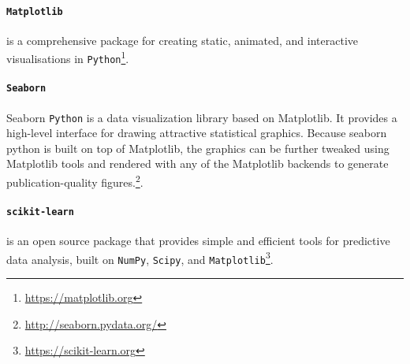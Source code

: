 \paragraph*{\texttt{Matplotlib}} is a comprehensive package for creating static, animated, and interactive visualisations in \texttt{Python}\footnote{\url{https://matplotlib.org}}.

\paragraph*{\texttt{Seaborn}} Seaborn \texttt{Python} is a data visualization library based on Matplotlib. It provides a high-level interface for drawing attractive statistical graphics. Because seaborn python is built on top of Matplotlib, the graphics can be further tweaked using Matplotlib tools and rendered with any of the Matplotlib backends to generate publication-quality figures.\footnote{\url{http://seaborn.pydata.org/}}.

\paragraph*{\texttt{scikit-learn}} is an open source package that provides simple and efficient tools for predictive data analysis, built on \texttt{NumPy}, \texttt{Scipy}, and \texttt{Matplotlib}\footnote{\url{https://scikit-learn.org}}.